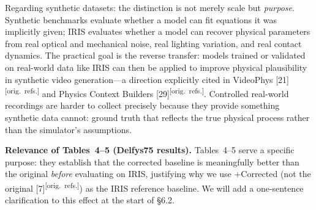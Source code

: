 \documentclass[10pt,twocolumn,letterpaper]{article}
\newcommand{\origref}{\textsuperscript{\normalfont\scriptsize[orig.\ refs.]}}
\begin{document}
Regarding synthetic datasets: the distinction is not merely scale but \emph{purpose}. Synthetic benchmarks evaluate whether a model can fit equations it was implicitly given; IRIS evaluates whether a model can recover physical parameters from real optical and mechanical noise, real lighting variation, and real contact dynamics. The practical goal is the reverse transfer: models trained or validated on real-world data like IRIS can then be applied to improve physical plausibility in synthetic video generation---a direction explicitly cited in VideoPhys [21]\origref{} and Physics Context Builders [29]\origref{}. Controlled real-world recordings are harder to collect precisely because they provide something synthetic data cannot: ground truth that reflects the true physical process rather than the simulator's assumptions.

\noindent\textbf{Relevance of Tables~4--5 (Delfys75 results).}
Tables~4--5 serve a specific purpose: they establish that the corrected baseline is meaningfully better than the original \emph{before} evaluating on IRIS, justifying why we use +Corrected (not the original [7]\origref{})
as the IRIS reference baseline. We will add a one-sentence clarification to this effect at the start of \S6.2.
\end{document}
